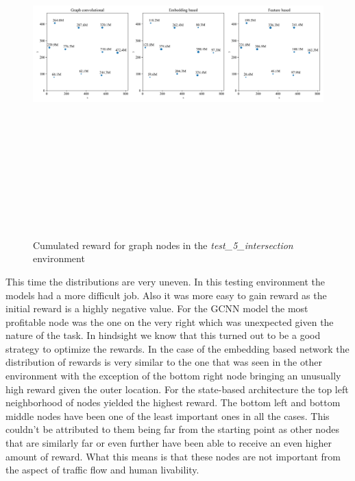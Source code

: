 \documentclass[
]{elteikthesis}[2023/04/10]
\begin{document}
\begin{figure}[H]
\begin{centering}
\includegraphics[width=14cm,height=14cm,keepaspectratio]{images/node_reward_plot_node_weights_plot_test_5_intersection_empty}
\par\end{centering}
\caption{Cumulated reward for graph nodes in the \emph{test\_5\_intersection}
environment}
\end{figure}

This time the distributions are very uneven. In this testing environment
the models had a more difficult job. Also it was more easy to gain
reward as the initial reward is a highly negative value. For the GCNN
model the most profitable node was the one on the very right which
was unexpected given the nature of the task. In hindsight we know
that this turned out to be a good strategy to optimize the rewards.
In the case of the embedding based network the distribution of rewards
is very similar to the one that was seen in the other environment
with the exception of the bottom right node bringing an unusually
high reward given the outer location. For the state-based architecture
the top left neighborhood of nodes yielded the highest reward. The
bottom left and bottom middle nodes have been one of the least important
ones in all the cases. This couldn't be attributed to them being far
from the starting point as other nodes that are similarly far or even
further have been able to receive an even higher amount of reward.
What this means is that these nodes are not important from the aspect
of traffic flow and human livability.
\end{document}
